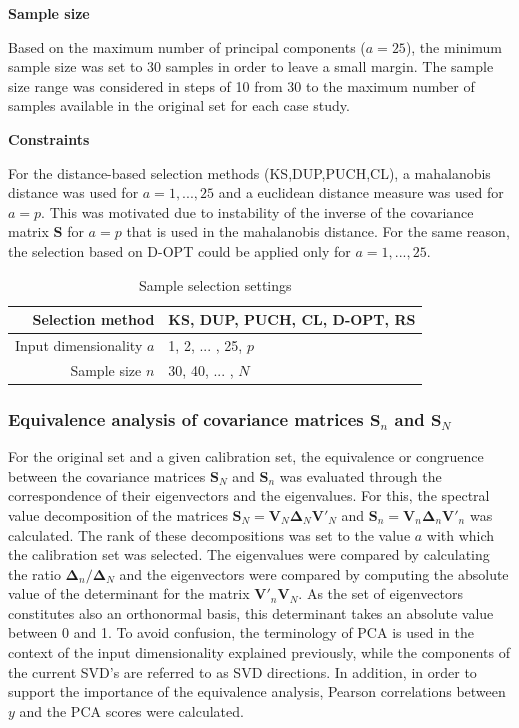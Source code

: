 \documentclass[journal=ancham,manuscript=article]{achemso}
\begin{document}
\textbf{Sample size}

Based on the maximum number of principal components ($a=25$), the minimum sample size was set to 30 samples in order to leave a small margin. The sample size range was considered in steps of 10 from 30 to the maximum number of samples available in the original set for each case study. 

\textbf{Constraints}

For the distance-based selection methods (KS,DUP,PUCH,CL), a mahalanobis distance was used for $a=1,...,25$ and a euclidean distance measure was used for $a=p$. This was motivated due to instability of the inverse of the covariance matrix $\mathbf{S}$ for $a=p$ that is used in the mahalanobis distance. For the same reason, the selection based on D-OPT could be applied only for $a=1,...,25$. 

\begin{table}[t]
\centering
\begin{tabular}{|r|l|} 
\hline
Selection method & KS, DUP, PUCH, CL, D-OPT, RS\\
\hline
Input dimensionality $a$ & 1, 2, ... , 25, $p$ \\
\hline
Sample size $n$ & 30, 40, ... , $N$ \\
\hline

\end{tabular}
\caption{Sample selection settings}
\label{tab_samplesel_settings_exhaustive_search}
\end{table}

\subsubsection{Equivalence analysis of covariance matrices $\mathbf{S}_n$ and $\mathbf{S}_N$}

For the original set and a given calibration set, the equivalence or congruence between the covariance matrices $\mathbf{S}_N$ and $\mathbf{S}_n$ was evaluated through the correspondence of their eigenvectors and the eigenvalues. For this, the spectral value decomposition of the matrices $\mathbf{S}_N = \mathbf{V}_N \mathbf{\Delta}_N \mathbf{V}'_N$ and $\mathbf{S}_n = \mathbf{V}_n \mathbf{\Delta}_n \mathbf{V}'_n$ was calculated. The rank of these decompositions was set to the value $a$ with which the calibration set was selected. The eigenvalues were compared by calculating the ratio  $\mathbf{\Delta}_n/\mathbf{\Delta}_N$ and the eigenvectors were compared by computing the absolute value of the determinant for the matrix $\mathbf{V}'_n\mathbf{V}_N$. As the set of eigenvectors constitutes also an orthonormal basis, this determinant takes an absolute value between 0 and 1. To avoid confusion, the terminology of PCA is used in the context of the input dimensionality explained previously, while the components of the current SVD's are referred to as SVD directions. 
In addition, in order to support the importance of the equivalence analysis, Pearson correlations between $y$ and the PCA scores were calculated.
\end{document}

